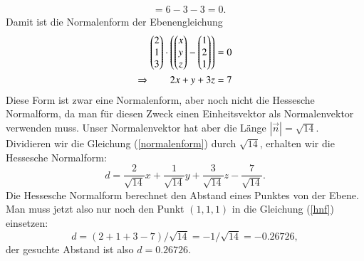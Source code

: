 \begin{beispiel}
\begin{align*}
&=6-3-3=0.
\end{align*}
Damit ist die Normalenform der Ebenengleichung
\begin{align}
\begin{pmatrix}2\\1\\3\end{pmatrix}\cdot\left(
\begin{pmatrix}x\\y\\z\end{pmatrix} - \begin{pmatrix}1\\2\\1\end{pmatrix}
\right)&=0\notag\\
\Rightarrow\qquad
2x+y+3z&=7\label{normalenform}
\end{align}
Diese Form ist zwar eine Normalenform, aber noch nicht die Hessesche
Normalform, da man für diesen Zweck einen Einheitsvektor als
Normalenvektor verwenden muss.
Unser Normalenvektor hat aber die Länge $|\vec n|=\sqrt{14}$.
Dividieren wir die Gleichung (\ref{normalenform})
durch $\sqrt{14}$, erhalten wir die Hessesche Normalform:
\begin{equation}
d=\frac{2}{\sqrt{14}}x+\frac{1}{\sqrt{14}}y+\frac{3}{\sqrt{14}}z-\frac{7}{\sqrt{14}}.
\label{hnf}
\end{equation}
Die Hessesche Normalform berechnet den Abstand eines Punktes von der
Ebene.
Man muss jetzt also nur noch den Punkt $(1,1,1)$ in die  Gleichung
(\ref{hnf}) einsetzen:
\[
d = (2+1+3-7)/\sqrt{14}=-1/\sqrt{14}=-0.26726,
\]
der gesuchte Abstand ist also $d=0.26726$.
\end{beispiel}

